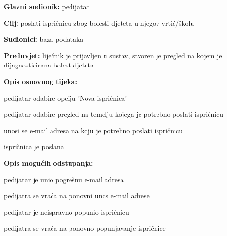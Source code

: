                     \noindent {}
					\begin{packed_item}
	
						\item \textbf{Glavni sudionik: }pedijatar
						\item  \textbf{Cilj:} poslati ispričnicu zbog bolesti djeteta u njegov vrtić/školu
						\item  \textbf{Sudionici:} baza podataka
						\item  \textbf{Preduvjet:} liječnik je prijavljen u sustav, stvoren je pregled na kojem je dijagnosticirana bolest djeteta
						\item  \textbf{Opis osnovnog tijeka:}
						
						\item[] \begin{packed_enum}
	
							\item pedijatar odabire opciju 'Nova ispričnica'
							\item pedijatar odabire pregled na temelju kojega je potrebno poslati ispričnicu
							\item unosi se e-mail adresa na koju je potrebno poslati ispričnicu
                            \item ispričnica je poslana

						\end{packed_enum}
						
						\item  \textbf{Opis mogućih odstupanja:}
						
						\item[] \begin{packed_item}
	
							\item[3.a] pedijatar je unio pogrešnu e-mail adresa
							\item[] \begin{packed_enum}
								
								\item pedijatra se vraća na ponovni unos e-mail adrese
							\end{packed_enum}
                            \item[3.b] pedijatar je neispravno popunio ispričnicu
							\item[] \begin{packed_enum}
								
								\item pedijatra se vraća na ponovno popunjavanje ispričnice
							\end{packed_enum}
							
						\end{packed_item}
					\end{packed_item}

